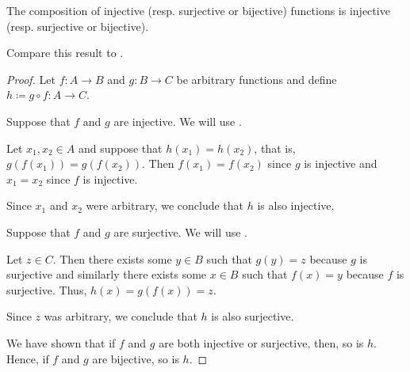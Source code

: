 \begin{proposition}\label{thm:function_composition_invertibility}
  The composition of injective (resp. surjective or bijective) functions is injective (resp. surjective or bijective).

  Compare this result to .
\end{proposition}
\begin{proof}
  Let \( f: A \to B \) and \( g: B \to C \) be arbitrary functions and define \( h \coloneqq g \circ f: A \to C \).

   Suppose that \( f \) and \( g \) are injective. We will use .

  Let \( x_1, x_2 \in A \) and suppose that \( h(x_1) = h(x_2) \), that is, \( g(f(x_1)) = g(f(x_2)) \). Then \( f(x_1) = f(x_2) \) since \( g \) is injective and \( x_1 = x_2 \) since \( f \) is injective.

  Since \( x_1 \) and \( x_2 \) were arbitrary, we conclude that \( h \) is also injective.

   Suppose that \( f \) and \( g \) are surjective. We will use .

  Let \( z \in C \). Then there exists some \( y \in B \) such that \( g(y) = z \) because \( g \) is surjective and similarly there exists some \( x \in B \) such that \( f(x) = y \) because \( f \) is surjective. Thus, \( h(x) = g(f(x)) = z \).

  Since \( z \) was arbitrary, we conclude that \( h \) is also surjective.

   We have shown that if \( f \) and \( g \) are both injective or surjective, then, so is \( h \). Hence, if \( f \) and \( g \) are bijective, so is \( h \).
\end{proof}

